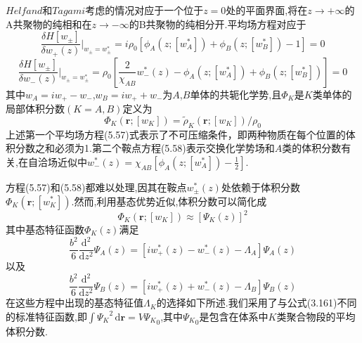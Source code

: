 $Helfand$和$Tagami$考虑的情况对应于一个位于$z=0$处的平面界面,将在$z\rightarrow +\infty$的A共聚物的纯相和在$z\rightarrow -\infty$的B共聚物的纯相分开.平均场方程对应于
\begin{equation}
{\frac{\delta H[w_\pm]}{\delta w_+(z)}}|_{w_\pm = w^*_\pm} = i\rho_0[\phi_A(z;[w^*_A])+\phi_B(z;[w^*_B])-1] = 0
\end{equation}
\begin{equation}
{\frac{\delta H[w_\pm]}{\delta w_-(z)}}|_{w_\pm = w^*_\pm} = \rho_0[\frac{2}{\chi_{AB}}w^*_-(z)-\phi_A(z;[w^*_A])+\phi_B(z;[w^*_B])]=0
\end{equation}
其中$w_A=iw_+ - w_-$,$w_B=iw_+ +w_-$为$A$,$B$单体的共轭化学势,且$\Phi_K$是$K$类单体的局部体积分数$(K=A,B)$定义为
\begin{equation}
\Phi_K(\mathbf{r};[w_K]) = \tilde{\rho}_K(\mathbf{r};[w_K])/\rho_0
\end{equation}
上述第一个平均场方程(5.57)式表示了不可压缩条件，即两种物质在每个位置的体积分数之和必须为1.第二个鞍点方程(5.58)表示交换化学势场和$A$类的体积分数有关,在自洽场近似中$w^*_-(z) = \chi_{AB}[\phi_A(z;[w^*_A])-\frac{1}{2}]$.

方程(5.57)和(5.58)都难以处理,因其在鞍点$w^*_\pm(z)$处依赖于体积分数$\Phi_K(\mathbf{r};[w^*_K])$.然而,利用基态优势近似,体积分数可以简化成
\begin{equation}
\Phi_K(\mathbf{r};[w_K]) \approx [\Psi_K(z)]^2
\end{equation}
其中基态特征函数$\Phi_K(z)$满足
\begin{equation}
\frac{b^{2}}{6}\frac{\mathrm{d}^{2}}{\mathrm{d} z^{2}} \Psi_{A}(z)=[iw_+^*(z)-w_-^*(z)-\Lambda_A]\Psi_{A}(z)
\end{equation}
以及
\begin{equation}
\frac{b^{2}}{6}\frac{\mathrm{d}^{2}}{\mathrm{d} z^{2}} \Psi_{B}(z)=[iw_+^*(z)+w_-^*(z)-\Lambda_B]\Psi_{B}(z)
\end{equation}
在这些方程中出现的基态特征值$\Lambda_K$的选择如下所述.我们采用了与公式(3.161)不同的标准特征函数,即$\int {\Psi_K}^2\,\mathrm{d}\mathbf{r}=V{\Psi_K}_0$,其中${\Psi_K}_0$是包含在体系中$K$类聚合物段的平均体积分数.

